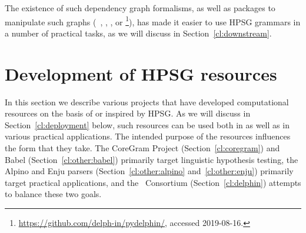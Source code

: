 \documentclass[output=paper,biblatex,babelshorthands,newtxmath,draftmode,colorlinks,citecolor=brown]{langscibook}
\begin{document}
The existence of such dependency graph formalisms,
as well as  packages to manipulate such graphs (\eg\ \citealt{ivanova2012dm}, \citealt{copestake2016pydmrs}, \citealt{Her:Kuh:Oep:19}, or \footnote{\url{https://github.com/delph-in/pydelphin/}, accessed 2019-08-16.}),
has made it easier to use HPSG grammars in a number of practical tasks,
as we will discuss in Section~\ref{cl:downstream}.








\section{Development of HPSG resources}
\label{cl:resources}


In this section we describe various projects that have developed computational
resources on the basis of or inspired by HPSG.  As we will discuss in Section~\ref{cl:deployment}
below, such resources can be used both in  as well as in various
practical applications.  The intended purpose of the resources influences the form that they
take.  The CoreGram Project (Section~\ref{cl:coregram}) and Babel (Section~\ref{cl:other:babel})
primarily target linguistic hypothesis testing, the Alpino and Enju parsers
(Section~\ref{cl:other:alpino} and~\ref{cl:other:enju}) primarily target practical applications, and
the \delphin\ Consortium (Section~\ref{cl:delphin}) attempts to balance these two goals.
\end{document}
